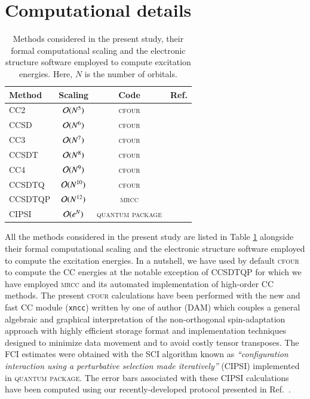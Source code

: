 \documentclass[aip,jcp,reprint,noshowkeys,superscriptaddress]{revtex4-1}
\newcommand{\QP}{\textsc{quantum package}}
\newcommand{\MRCC}{\textsc{mrcc}}
\newcommand{\CFOUR}{\textsc{cfour}}
\begin{document}
\section{Computational details}

\begin{table}
	\caption{Methods considered in the present study, their formal computational scaling and the electronic structure software employed to compute excitation energies.
	Here, $N$ is the number of orbitals.
	\label{tab:scaling}}
	\begin{ruledtabular}
	\begin{tabular}{lccc}
		Method	&	Scaling					&	Code		&	Ref.					\\
		\hline
		CC2			&	$\order*{N^{5}}$	&	\CFOUR		&	\onlinecite{cfour}		\\
		CCSD		&	$\order*{N^{6}}$	&	\CFOUR		&	\onlinecite{cfour}		\\
		CC3			&	$\order*{N^{7}}$	&	\CFOUR		&	\onlinecite{cfour}		\\
		CCSDT		&	$\order*{N^{8}}$	&	\CFOUR		&	\onlinecite{cfour}		\\
		CC4			&	$\order*{N^{9}}$	&	\CFOUR		&	\onlinecite{cfour}		\\
		CCSDTQ		&	$\order*{N^{10}}$	&	\CFOUR		&	\onlinecite{cfour}		\\
		CCSDTQP		&	$\order*{N^{12}}$	&	\MRCC		&	\onlinecite{mrcc}		\\	
		CIPSI		&	$\order*{e^{N}}$	&	\QP			&	\onlinecite{qp2}		\\
	\end{tabular}
	\end{ruledtabular}
\end{table}

All the methods considered in the present study are listed in Table \ref{tab:scaling} alongside their formal computational scaling and the electronic structure software employed to compute the excitation energies.
In a nutshell, we have used by default {\CFOUR} \cite{cfour} to compute the CC energies at the notable exception of CCSDTQP for which we have employed {\MRCC} and its automated implementation of high-order CC methods. \cite{mrcc}
The present {\CFOUR} calculations have been performed with the new and fast CC module (\texttt{xncc})  written by one of author (DAM) which couples a general algebraic
and graphical interpretation of the non-orthogonal spin-adaptation approach with highly efficient storage format and implementation techniques designed to minimize data movement and to avoid costly tensor transposes. \cite{Matthews_2015b}
The FCI estimates were obtained with the SCI algorithm known as \textit{``configuration interaction using a perturbative selection made iteratively''} (CIPSI) implemented in {\QP}. \cite{qp2}
The error bars associated with these CIPSI calculations have been computed using our recently-developed protocol presented in Ref.~.
\end{document}
